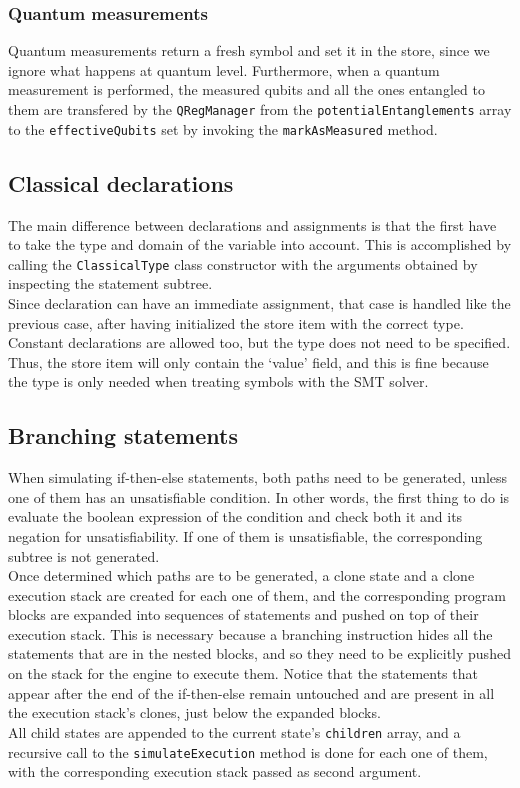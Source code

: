 \documentclass[12pt,a4paper]{report}
\theoremstyle{definition}
\theoremstyle{definition}
\theoremstyle{definition}
\begin{document}
\subsubsection{Quantum measurements}
Quantum measurements return a fresh symbol and set it in the store, since we ignore what happens at quantum level. Furthermore, when a quantum measurement is performed, the measured qubits and all the ones entangled to them are transfered by the \texttt{QRegManager} from the \texttt{potentialEntanglements} array to the \texttt{effectiveQubits} set by invoking the \texttt{markAsMeasured} method.

\subsection{Classical declarations}
The main difference between declarations and assignments is that the first have to take the type and domain of the variable into account. This is accomplished by calling the \texttt{ClassicalType} class constructor with the arguments obtained by inspecting the statement subtree.\\
Since declaration can have an immediate assignment, that case is handled like the previous case, after having initialized the store item with the correct type.\\
Constant declarations are allowed too, but the type does not need to be specified. Thus, the store item will only contain the `value' field, and this is fine because the type is only needed when treating symbols with the SMT solver.

\subsection{Branching statements}
When simulating if-then-else statements, both paths need to be generated, unless one of them has an unsatisfiable condition. In other words, the first thing to do is evaluate the boolean expression of the condition and check both it and its negation for unsatisfiability. If one of them is unsatisfiable, the corresponding subtree is not generated.\\
Once determined which paths are to be generated, a clone state and a clone execution stack are created for each one of them, and the corresponding program blocks are expanded into sequences of statements and pushed on top of their execution stack. This is necessary because a branching instruction hides all the statements that are in the nested blocks, and so they need to be explicitly pushed on the stack for the engine to execute them. Notice that the statements that appear after the end of the if-then-else remain untouched and are present in all the execution stack's clones, just below the expanded blocks.\\
All child states are appended to the current state's \texttt{children} array, and a recursive call to the \texttt{simulateExecution} method is done for each one of them, with the corresponding execution stack passed as second argument.
\end{document}

